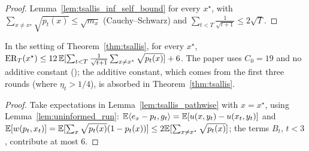 \begin{proof}
  \leanok
  Lemma~\ref{lem:tsallis_inf_self_bound} for every $x^\star$, with $\sum_{x \ne x^\star}
  \sqrt{p_t(x)} \le \sqrt{m_x}$ (Cauchy--Schwarz) and $\sum_{t < T}\frac{1}{\sqrt{t + 1}} \le
  2\sqrt T$.
\end{proof}

\begin{lemma}
  \label{lem:tsallis_inf_self_bound}
  \leanok
  In the setting of Theorem~\ref{thm:tsallis}, for every $x^\star$,
  $\mathrm{ER}_T(x^\star) \le 12\,\mathbb{E}[\sum_{t < T}\frac{1}{\sqrt{t + 1}}\sum_{x \ne x^\star}\sqrt{p_t(x)}] +
  6$. The paper uses $C_0 = 19$ and no additive constant
  (\cite[Theorem 1]{ito2025instancedependent}); the additive constant, which comes from the first
  three rounds (where $\eta_t > 1/4$), is absorbed in Theorem~\ref{thm:tsallis}.
\end{lemma}

\begin{proof}
  \leanok
  Take expectations in Lemma~\ref{lem:tsallis_pathwise} with $x = x^\star$, using
  Lemma~\ref{lem:uninformed_run}: $\mathbb{E}\langle e_x - p_t, g_t\rangle = \mathbb{E}[u(x, y_t) - u(x_t, y_t)]$
  and $\mathbb{E}[w(p_t, x_t)] = \mathbb{E}[\sum_x\sqrt{p_t(x)}(1 - p_t(x))] \le 2\mathbb{E}[\sum_{x \ne
  x^\star}\sqrt{p_t(x)}]$; the terms $B_t$, $t < 3$, contribute at most $6$.
\end{proof}

